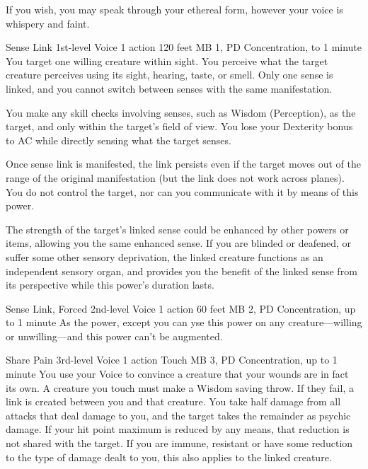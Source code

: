 If you wish,
you may speak through your ethereal form,
however your voice is whispery and faint.

\DndPowerHeader%
  {Sense Link}
  {1st-level Voice}
  {1 action}
  {120 feet}
  {MB 1, PD \lvlone}
  {Concentration, to 1 minute}
  You target one willing creature within sight.
  You perceive what the target creature perceives using its sight,
  hearing, taste, or smell.
  Only one sense is linked,
  and you cannot switch between senses with the same manifestation.

  You make any skill checks involving senses,
  such as Wisdom (Perception), as the target,
  and only within the target's field of view.
  You lose your Dexterity bonus to AC while
  directly sensing what the target senses.
  
  Once sense link is manifested, the link persists
  even if the target moves out of the range
  of the original manifestation
  (but the link does not work across planes).
  You do not control the target,
  nor can you communicate with it by means of this power.
  
  The strength of the target's linked sense could be enhanced
  by other powers or items,
  allowing you the same enhanced sense.
  If you are blinded or deafened, or suffer some other sensory deprivation,
  the linked creature functions as an independent sensory organ,
  and provides you the benefit of the linked sense from its perspective
  while this power's duration lasts.

\DndPowerHeader%
  {Sense Link, Forced}
  {2nd-level Voice}
  {1 action}
  {60 feet}
  {MB 2, PD \lvltwo}
  {Concentration, up to 1 minute}
As the  power,
except you can yse this power on any creature---willing or
unwilling---and this power can't be augmented.

\DndPowerHeader%
  {Share Pain}
  {3rd-level Voice}
  {1 action}
  {Touch}
  {MB 3, PD \lvlthree}
  {Concentration, up to 1 minute}
  You use your Voice to convince a creature that your wounds are
  in fact its own.
  A creature you touch must make a Wisdom saving throw.
  If they fail, a link is created between you and that creature.
  You take half damage from all attacks that deal damage to you,
  and the target takes the remainder as psychic damage.
  If your hit point maximum is reduced by any means,
  that reduction is not shared with the target.
  If you are immune, resistant or have some reduction
  to the type of damage dealt to you,
  this also applies to the linked creature. 
  
